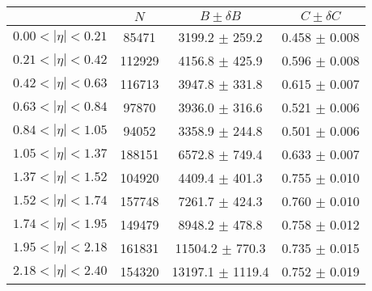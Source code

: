 \begin{tabular}{lccc}
\hline
    &   $N$   & $B \pm \delta B$  &  $C \pm \delta C$ \\
\hline
$0.00 < |\eta| <0.21$          & 85471      & 3199.2     $\pm$ 259.2 & 0.458      $\pm$ 0.008 \\
$0.21 < |\eta| <0.42$          & 112929     & 4156.8     $\pm$ 425.9 & 0.596      $\pm$ 0.008 \\
$0.42 < |\eta| <0.63$          & 116713     & 3947.8     $\pm$ 331.8 & 0.615      $\pm$ 0.007 \\
$0.63 < |\eta| <0.84$          & 97870      & 3936.0     $\pm$ 316.6 & 0.521      $\pm$ 0.006 \\
$0.84 < |\eta| <1.05$          & 94052      & 3358.9     $\pm$ 244.8 & 0.501      $\pm$ 0.006 \\
$1.05 < |\eta| <1.37$          & 188151     & 6572.8     $\pm$ 749.4 & 0.633      $\pm$ 0.007 \\
$1.37 < |\eta| <1.52$          & 104920     & 4409.4     $\pm$ 401.3 & 0.755      $\pm$ 0.010 \\
$1.52 < |\eta| <1.74$          & 157748     & 7261.7     $\pm$ 424.3 & 0.760      $\pm$ 0.010 \\
$1.74 < |\eta| <1.95$          & 149479     & 8948.2     $\pm$ 478.8 & 0.758      $\pm$ 0.012 \\
$1.95 < |\eta| <2.18$          & 161831     & 11504.2    $\pm$ 770.3 & 0.735      $\pm$ 0.015 \\
$2.18 < |\eta| <2.40$          & 154320     & 13197.1    $\pm$ 1119.4 & 0.752      $\pm$ 0.019 \\
\hline
\end{tabular}
